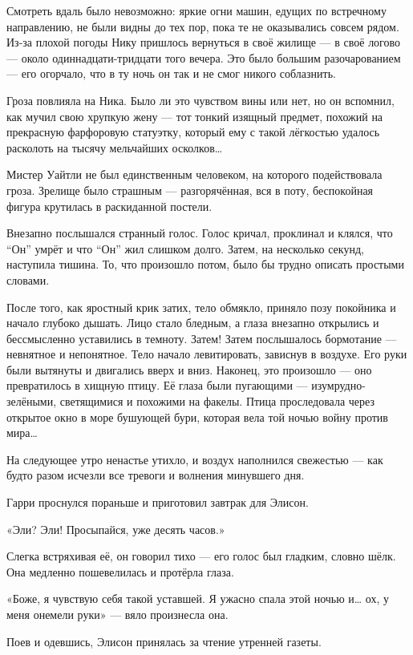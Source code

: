 \documentclass[a5paper, 9pt,
final, openany, twoside=true]{memoir}
\begin{document}
Смотреть вдаль было невозможно: яркие огни машин, едущих по встречному направлению, не были видны до тех пор, пока те не оказывались совсем рядом. Из-за плохой погоды Нику пришлось вернуться в своё жилище — в своё логово — около одиннадцати-тридцати того вечера. Это было большим разочарованием — его огорчало, что в ту ночь он так и не смог никого соблазнить.

Гроза повлияла на Ника. Было ли это чувством вины или нет, но он вспомнил, как мучил свою хрупкую жену — тот тонкий изящный предмет, похожий на прекрасную фарфоровую статуэтку, который ему с такой лёгкостью удалось расколоть на тысячу мельчайших осколков…\bigskip

Мистер Уайтли не был единственным человеком, на которого подействовала гроза. Зрелище было страшным — разгорячённая, вся в поту, беспокойная фигура крутилась в раскиданной постели.

Внезапно послышался странный голос. Голос кричал, проклинал и клялся, что ``Он'' умрёт и что ``Он'' жил слишком долго. Затем, на несколько секунд, наступила тишина. То, что произошло потом, было бы трудно описать простыми словами.

После того, как яростный крик затих, тело обмякло, приняло позу покойника и начало глубоко дышать. Лицо стало бледным, а глаза внезапно открылись и бессмысленно уставились в темноту. Затем! Затем послышалось бормотание — невнятное и непонятное. Тело начало левитировать, зависнув в воздухе. Его руки были вытянуты и двигались вверх и вниз. Наконец, это произошло — оно превратилось в хищную птицу. Её глаза были пугающими — изумрудно-зелёными, светящимися и похожими на факелы. Птица проследовала через открытое окно в море бушующей бури, которая вела той ночью войну против мира…\bigskip

На следующее утро ненастье утихло, и воздух наполнился свежестью — как будто разом исчезли все тревоги и волнения минувшего дня.

Гарри проснулся пораньше и приготовил завтрак для Элисон.\bigskip

«Эли? Эли! Просыпайся, уже десять часов.»

Слегка встряхивая её, он говорил тихо — его голос был гладким, словно шёлк. Она медленно пошевелилась и протёрла глаза.

«Боже, я чувствую себя такой уставшей. Я ужасно спала этой ночью и… ох, у меня онемели руки» — вяло произнесла она.

Поев и одевшись, Элисон принялась за чтение утренней газеты.
\end{document}
